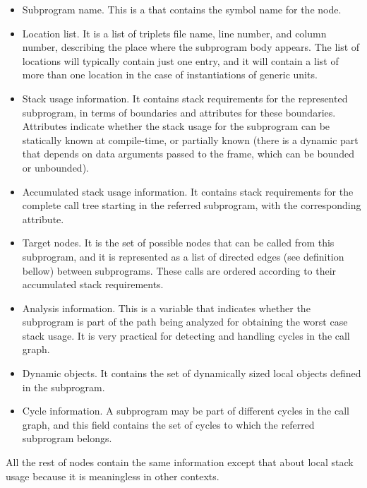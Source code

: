 \begin{itemize}

\item Subprogram name. This is a  that contains the
  symbol name for the node.
\item Location list. It is a list of triplets file name, line number,
 and column number, describing the place where the subprogram body
 appears. The list of locations will typically contain just one entry,
 and it will contain a list of more than one location in the case of
 instantiations of generic units.

\item Stack usage information. It contains stack requirements for the
  represented subprogram, in terms of boundaries and attributes for
  these boundaries. Attributes indicate whether the stack usage for
  the subprogram can be statically known at compile-time, or partially
  known (there is a dynamic part that depends on data arguments passed
  to the frame, which can be bounded or unbounded).

\item Accumulated stack usage information. It contains stack
  requirements for the complete call tree starting in the referred
  subprogram, with the corresponding attribute.

\item Target nodes. It is the set of possible nodes that can be called
  from this subprogram, and it is represented as a list of directed
  edges (see definition bellow) between subprograms. These calls are
  ordered according to their accumulated stack requirements.

\item Analysis information. This is a  variable that
  indicates whether the subprogram is part of the path being analyzed
  for obtaining the worst case stack usage. It is very practical for
  detecting and handling cycles in the call graph.

\item Dynamic objects. It contains the set of dynamically sized local
  objects defined in the subprogram.

\item Cycle information. A subprogram may be part of different cycles
  in the call graph, and this field contains the set of cycles to
  which the referred subprogram belongs.

\end{itemize}

All the rest of nodes contain the same information except that about
local stack usage because it is meaningless in other contexts.


